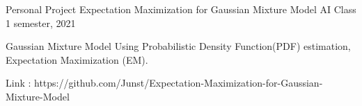 \begin{cventries}
  \cventry
    {Personal Project} %
    {Expectation Maximization for Gaussian Mixture Model} %
    {AI Class} %
    {1 semester, 2021} %
    {
      \begin{cvitems} %
        \item {Gaussian Mixture Model Using Probabilistic Density Function(PDF) estimation, Expectation Maximization (EM).}
        \item {Link : https://github.com/Junst/Expectation-Maximization-for-Gaussian-Mixture-Model }
      \end{cvitems}
    }
        
\end{cventries}

